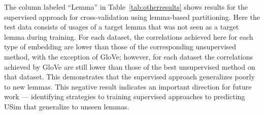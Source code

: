 \documentclass[11pt]{article}
\newcommand\original{\textsc{Original}\xspace}
\newcommand\glove{GloVe\xspace}
\newcommand{\tabref}[1]{Table~\ref{#1}}
\begin{document}



The column labeled ``Lemma'' in \tabref{tab:otherresults} shows
results for the supervised approach for cross-validation using
lemma-based partitioning. Here the test data consists of usages of a
target lemma that was not seen as a target lemma during training. For
each dataset, the correlations achieved here for each type of
embedding are lower than those of the corresponding unsupervised
method, with the exception of \glove; however, for each dataset the
correlations achieved by \glove are still lower than those of the best
unsupervised method on that dataset. This demonstrates that the
supervised approach generalizes poorly to new lemmas. This negative
result indicates an important direction for future work ---
identifying strategies to training supervised approaches to predicting
USim that generalize to unseen lemmas.




\end{document}
